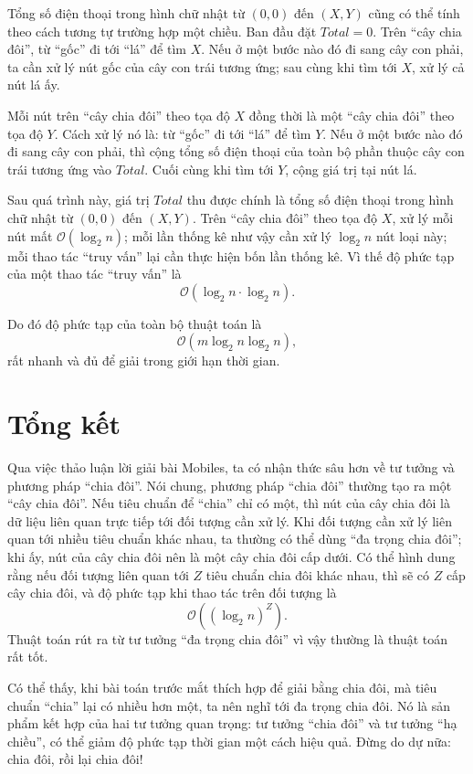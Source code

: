 \documentclass[11pt]{article}
\newcommand{\Oh}{\mathcal{O}}
\begin{document}
Tổng số điện thoại trong hình chữ nhật từ \((0,0)\) đến \((X,Y)\) cũng có thể
tính theo cách tương tự trường hợp một chiều. Ban đầu đặt
\(\mathit{Total}=0\). Trên ``cây chia đôi'', từ ``gốc'' đi tới ``lá'' để tìm
\(X\). Nếu ở một bước nào đó đi sang cây con phải, ta cần xử lý nút gốc của
cây con trái tương ứng; sau cùng khi tìm tới \(X\), xử lý cả nút lá ấy.

Mỗi nút trên ``cây chia đôi'' theo tọa độ \(X\) đồng thời là một ``cây chia
đôi'' theo tọa độ \(Y\). Cách xử lý nó là: từ ``gốc'' đi tới ``lá'' để tìm
\(Y\). Nếu ở một bước nào đó đi sang cây con phải, thì cộng tổng số điện
thoại của toàn bộ phần thuộc cây con trái tương ứng vào \(\mathit{Total}\).
Cuối cùng khi tìm tới \(Y\), cộng giá trị tại nút lá.

Sau quá trình này, giá trị \(\mathit{Total}\) thu được chính là tổng số điện
thoại trong hình chữ nhật từ \((0,0)\) đến \((X,Y)\). Trên ``cây chia đôi''
theo tọa độ \(X\), xử lý mỗi nút mất \(\Oh(\log_2 n)\); mỗi lần thống kê như
vậy cần xử lý \(\log_2 n\) nút loại này; mỗi thao tác ``truy vấn'' lại cần
thực hiện bốn lần thống kê. Vì thế độ phức tạp của một thao tác ``truy vấn''
là
\[
  \Oh(\log_2 n\cdot \log_2 n).
\]

Do đó độ phức tạp của toàn bộ thuật toán là
\[
  \Oh(m\log_2 n\log_2 n),
\]
rất nhanh và đủ để giải trong giới hạn thời gian.

\section{Tổng kết}

Qua việc thảo luận lời giải bài Mobiles, ta có nhận thức sâu hơn về tư tưởng
và phương pháp ``chia đôi''. Nói chung, phương pháp ``chia đôi'' thường tạo ra
một ``cây chia đôi''. Nếu tiêu chuẩn để ``chia'' chỉ có một, thì nút của cây
chia đôi là dữ liệu liên quan trực tiếp tới đối tượng cần xử lý. Khi đối tượng
cần xử lý liên quan tới nhiều tiêu chuẩn khác nhau, ta thường có thể dùng
``đa trọng chia đôi''; khi ấy, nút của cây chia đôi nên là một cây chia đôi
cấp dưới. Có thể hình dung rằng nếu đối tượng liên quan tới \(Z\) tiêu chuẩn
chia đôi khác nhau, thì sẽ có \(Z\) cấp cây chia đôi, và độ phức tạp khi thao
tác trên đối tượng là
\[
  \Oh\!\left((\log_2 n)^Z\right).
\]
Thuật toán rút ra từ tư tưởng ``đa trọng chia đôi'' vì vậy thường là thuật
toán rất tốt.

Có thể thấy, khi bài toán trước mắt thích hợp để giải bằng chia đôi, mà tiêu
chuẩn ``chia'' lại có nhiều hơn một, ta nên nghĩ tới đa trọng chia đôi. Nó là
sản phẩm kết hợp của hai tư tưởng quan trọng: tư tưởng ``chia đôi'' và tư
tưởng ``hạ chiều'', có thể giảm độ phức tạp thời gian một cách hiệu quả. Đừng
do dự nữa: chia đôi, rồi lại chia đôi!
\end{document}
